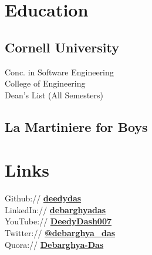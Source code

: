 \documentclass[letterpaper]{deedy-resume} %
\begin{document}
\begin{minipage}[t]{0.33\textwidth} %


\section{Education} 

\subsection{Cornell University}


\sectionspace %

Conc. in Software Engineering \\
College of Engineering \\
Dean's List (All Semesters) \\

\sectionspace %


\subsection{La Martiniere for Boys}


\sectionspace %


\section{Links} 

Github:// \href{https://github.com/deedydas}{\bf deedydas} \\
LinkedIn:// \href{https://www.linkedin.com/in/debarghyadas}{\bf debarghyadas} \\
YouTube:// \href{https://www.youtube.com/user/DeedyDash007}{\bf DeedyDash007} \\
Twitter:// \href{https://twitter.com/debarghya_das}{\bf @debarghya\_das} \\
Quora:// \href{https://www.quora.com/Debarghya-Das}{\bf Debarghya-Das}


\end{minipage}
\end{document}
